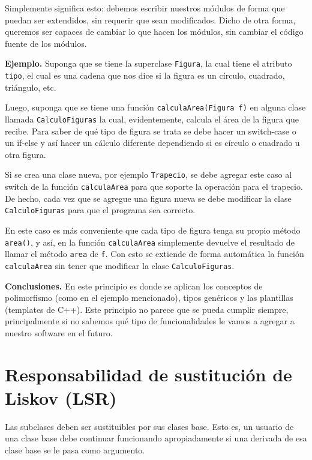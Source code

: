 \documentclass{article}
\begin{document}
Simplemente significa esto: debemos escribir nuestros módulos de forma que puedan ser extendidos, sin requerir que sean modificados. Dicho de otra forma, queremos ser capaces de cambiar lo que hacen los módulos, sin cambiar el código fuente de los módulos.

\textbf{Ejemplo.} Suponga que se tiene la superclase \texttt{Figura}, la cual tiene el atributo \texttt{tipo}, el cual es una cadena que nos dice si la figura es un círculo, cuadrado, triángulo, etc.

Luego, suponga que se tiene una función \texttt{calculaArea(Figura f)} en alguna clase llamada \texttt{CalculoFiguras} la cual, evidentemente, calcula el área de la figura que recibe. Para saber de qué tipo de figura se trata se debe hacer un switch-case o un if-else y así hacer un cálculo diferente dependiendo si es círculo o cuadrado u otra figura.

Si se crea una clase nueva, por ejemplo \texttt{Trapecio}, se debe agregar este caso al switch de la función \texttt{calculaArea} para que soporte la operación para el trapecio. De hecho, cada vez que se agregue una figura nueva se debe modificar la clase \texttt{CalculoFiguras} para que el programa sea correcto.

En este caso es más conveniente que cada tipo de figura tenga su propio método \texttt{area()}, y así, en la función \texttt{calculaArea} simplemente devuelve el resultado de llamar el método \texttt{area} de \texttt{f}. Con esto se extiende de forma automática la función \texttt{calculaArea} sin tener que modificar la clase \texttt{CalculoFiguras}.

\textbf{Conclusiones.} En este principio es donde se aplican los conceptos de polimorfismo (como en el ejemplo mencionado), tipos genéricos y las plantillas (templates de C++). Este principio no parece que se pueda cumplir siempre, principalmente si no sabemos qué tipo de funcionalidades le vamos a agregar a nuestro software en el futuro.

\section{Responsabilidad de sustitución de Liskov (LSR)}

Las subclases deben ser sustituibles por sus clases base. Esto es, un usuario de una clase base debe continuar funcionando apropiadamente si una derivada de esa clase base se le pasa como argumento.
\end{document}
